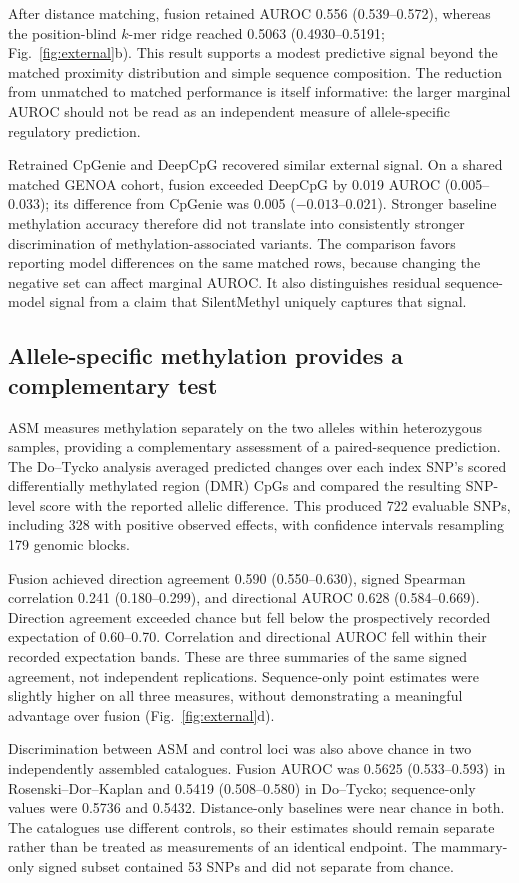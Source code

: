 \documentclass[11pt,letterpaper,twocolumn]{article}
\begin{document}
After distance matching, fusion retained AUROC 0.556 (0.539--0.572), whereas the position-blind $k$-mer ridge reached 0.5063 (0.4930--0.5191; Fig.~\ref{fig:external}b). This result supports a modest predictive signal beyond the matched proximity distribution and simple sequence composition. The reduction from unmatched to matched performance is itself informative: the larger marginal AUROC should not be read as an independent measure of allele-specific regulatory prediction.

Retrained CpGenie and DeepCpG recovered similar external signal. On a shared matched GENOA cohort, fusion exceeded DeepCpG by 0.019 AUROC (0.005--0.033); its difference from CpGenie was 0.005 ($-0.013$--0.021). Stronger baseline methylation accuracy therefore did not translate into consistently stronger discrimination of methylation-associated variants. The comparison favors reporting model differences on the same matched rows, because changing the negative set can affect marginal AUROC. It also distinguishes residual sequence-model signal from a claim that SilentMethyl uniquely captures that signal.

\subsection{Allele-specific methylation provides a complementary test}
ASM measures methylation separately on the two alleles within heterozygous samples, providing a complementary assessment of a paired-sequence prediction. The Do--Tycko analysis averaged predicted changes over each index SNP's scored differentially methylated region (DMR) CpGs and compared the resulting SNP-level score with the reported allelic difference. This produced 722 evaluable SNPs, including 328 with positive observed effects, with confidence intervals resampling 179 genomic blocks.

Fusion achieved direction agreement 0.590 (0.550--0.630), signed Spearman correlation 0.241 (0.180--0.299), and directional AUROC 0.628 (0.584--0.669). Direction agreement exceeded chance but fell below the prospectively recorded expectation of 0.60--0.70. Correlation and directional AUROC fell within their recorded expectation bands. These are three summaries of the same signed agreement, not independent replications. Sequence-only point estimates were slightly higher on all three measures, without demonstrating a meaningful advantage over fusion (Fig.~\ref{fig:external}d).

Discrimination between ASM and control loci was also above chance in two independently assembled catalogues. Fusion AUROC was 0.5625 (0.533--0.593) in Rosenski--Dor--Kaplan and 0.5419 (0.508--0.580) in Do--Tycko; sequence-only values were 0.5736 and 0.5432. Distance-only baselines were near chance in both. The catalogues use different controls, so their estimates should remain separate rather than be treated as measurements of an identical endpoint. The mammary-only signed subset contained 53 SNPs and did not separate from chance.
\end{document}
